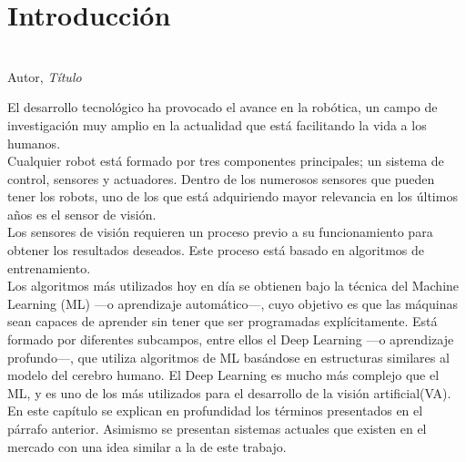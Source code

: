 \chapter{Introducción}
\label{cap:capitulo1}
\setcounter{page}{1}

\begin{flushright}
\begin{minipage}[]{10cm}
\end{minipage}\\

Autor, \textit{Título}\\
\end{flushright}

\vspace{1cm}

El desarrollo tecnológico ha provocado el avance en la robótica, un campo de investigación muy amplio en la actualidad que está facilitando la vida a los humanos.\\
Cualquier robot está formado por tres componentes principales; un sistema de control, sensores y actuadores. Dentro de los numerosos sensores que pueden tener los robots, uno de los que está adquiriendo mayor relevancia en los últimos años es el sensor de visión.\\
Los sensores de visión requieren un proceso previo a su funcionamiento para obtener los resultados deseados. Este proceso está basado en algoritmos de entrenamiento.\\
Los algoritmos más utilizados hoy en día se obtienen bajo la técnica del Machine Learning (ML) ---o aprendizaje automático---, cuyo objetivo es que las máquinas sean capaces de aprender sin tener que ser programadas explícitamente. Está formado por diferentes subcampos, entre ellos el Deep Learning ---o aprendizaje profundo---, que utiliza algoritmos de ML basándose en estructuras similares al modelo del cerebro humano. El Deep Learning es mucho más complejo que el ML, y es uno de los más utilizados para el desarrollo de la visión artificial(VA).\\

En este capítulo se explican en profundidad los términos presentados en el párrafo anterior. Asimismo se presentan sistemas actuales que existen en el mercado con una idea similar a la de este trabajo.\\


